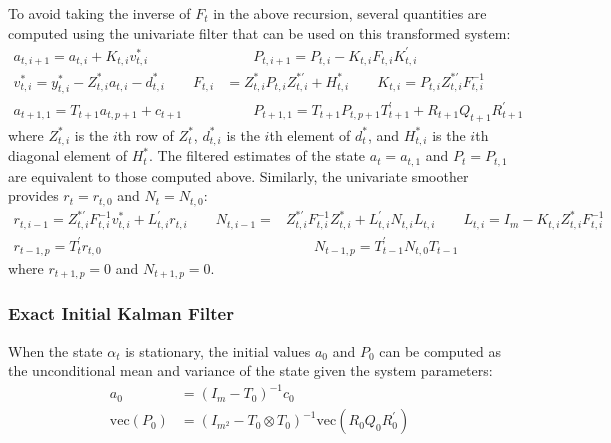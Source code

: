 \documentclass[12pt]{article}
\newcommand{\vecop}[0]{\text{vec}}
\begin{document}
	To avoid taking the inverse of $F_t$ in the above recursion, several quantities are computed using the univariate filter that can be used on this transformed system: 
	\begin{align*}
	a_{t, i+1} = a_{t,i} + K_{t,i} v_{t,i}^* &\qquad P_{t,i+1} = P_{t,i} - K_{t,i} F_{t,i} K_{t,i}^{\prime} \\
	v_{t,i}^* = y_{t,i}^* - Z_{t,i}^* a_{t,i} - d_{t,i}^* \qquad F_{t,i} &= Z_{t,i}^* P_{t,i} Z_{t,i}^{*\prime} + H_{t,i}^* \qquad K_{t,i} = P_{t,i} Z_{t,i}^{*\prime} F_{t,i}^{-1} \\ 
	a_{t+1,1} = T_{t+1} a_{t, p+1} + c_{t+1} &\qquad P_{t+1,1} = T_{t+1} P_{t,p+1} T_{t+1}^\prime + R_{t+1} Q_{t+1} R_{t+1}^\prime
	\end{align*}
	where $Z_{t,i}^*$ is the $i$th row of $Z_t^*$, $d_{t,i}^*$ is the $i$th element of $d_t^*$, and $H_{t,i}^*$ is the $i$th diagonal element of $H_t^*$. The filtered estimates of the state $a_t = a_{t,1}$ and $P_t = P_{t,1}$ are equivalent to those computed above. Similarly, the univariate smoother provides $r_t = r_{t,0}$ and $N_t = N_{t,0}$:
	\begin{align*}
	r_{t,i-1} = Z_{t,i}^{*\prime} F_{t,i}^{-1} v_{t,i}^* + L_{t,i}^{\prime} r_{t,i} \qquad N_{t,i-1} =& Z_{t,i}^{*\prime} F_{t,i}^{-1} Z_{t,i}^* + L_{t,i}^{\prime} N_{t,i} L_{t,i} \qquad L_{t,i} = I_m - K_{t,i} Z_{t,i}^* F_{t,i}^{-1}\\
	r_{t-1,p} = T_{t}^\prime r_{t,0} &\qquad N_{t-1,p} = T_{t-1}^\prime N_{t,0} T_{t-1}
	\end{align*}
	where $r_{t+1,p} = 0$ and $N_{t+1,p} = 0$. \\

\subsubsection*{Exact Initial Kalman Filter}
	When the state $\alpha_t$ is stationary, the initial values $a_0$ and $P_0$ can be computed as the unconditional mean and variance of the state given the system parameters: 
	\begin{align*}
	a_0 &= (I_m - T_0)^{-1} c_0 \\
	\vecop(P_0) &= (I_{m^2} - T_0 \otimes T_0)^{-1} \vecop(R_0 Q_0 R_0^\prime) 
	\end{align*}
\end{document}
